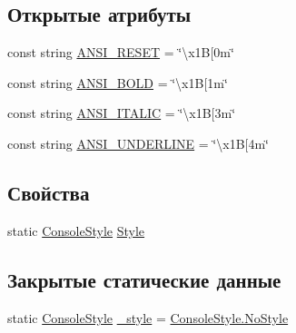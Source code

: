 \subsection*{Открытые атрибуты}
\begin{DoxyCompactItemize}
\item 
const string \hyperlink{class_a_s_c_i_i_wars_1_1_console_graphics_1_1_my_console_a08a9b176141ff0c51559234ffb0ad127}{A\+N\+S\+I\+\_\+\+R\+E\+S\+ET} = \char`\"{}\textbackslash{}x1B\mbox{[}0m\char`\"{}
\item 
const string \hyperlink{class_a_s_c_i_i_wars_1_1_console_graphics_1_1_my_console_ac0edfa66a89ea22bdc8315c357665fba}{A\+N\+S\+I\+\_\+\+B\+O\+LD} = \char`\"{}\textbackslash{}x1B\mbox{[}1m\char`\"{}
\item 
const string \hyperlink{class_a_s_c_i_i_wars_1_1_console_graphics_1_1_my_console_a78301f49f068fdc8f836db81945b29e5}{A\+N\+S\+I\+\_\+\+I\+T\+A\+L\+IC} = \char`\"{}\textbackslash{}x1B\mbox{[}3m\char`\"{}
\item 
const string \hyperlink{class_a_s_c_i_i_wars_1_1_console_graphics_1_1_my_console_a1730e5dfb4c14b688b5d7451c4a71e30}{A\+N\+S\+I\+\_\+\+U\+N\+D\+E\+R\+L\+I\+NE} = \char`\"{}\textbackslash{}x1B\mbox{[}4m\char`\"{}
\end{DoxyCompactItemize}
\subsection*{Свойства}
\begin{DoxyCompactItemize}
\item 
static \hyperlink{namespace_a_s_c_i_i_wars_1_1_console_graphics_a9b323f4b2bf48062c9245b24e74b2882}{Console\+Style} \hyperlink{class_a_s_c_i_i_wars_1_1_console_graphics_1_1_my_console_a2a25ec7c9c245a9a479453f71bd30c2d}{Style}
\end{DoxyCompactItemize}
\subsection*{Закрытые статические данные}
\begin{DoxyCompactItemize}
\item 
static \hyperlink{namespace_a_s_c_i_i_wars_1_1_console_graphics_a9b323f4b2bf48062c9245b24e74b2882}{Console\+Style} \hyperlink{class_a_s_c_i_i_wars_1_1_console_graphics_1_1_my_console_a6c024c3a9ff580d84a2260a750af20a4}{\+\_\+style} = \hyperlink{namespace_a_s_c_i_i_wars_1_1_console_graphics_a9b323f4b2bf48062c9245b24e74b2882aaf0ab25243139e9c44bdbfbde2ce6f1d}{Console\+Style.\+No\+Style}
\end{DoxyCompactItemize}


